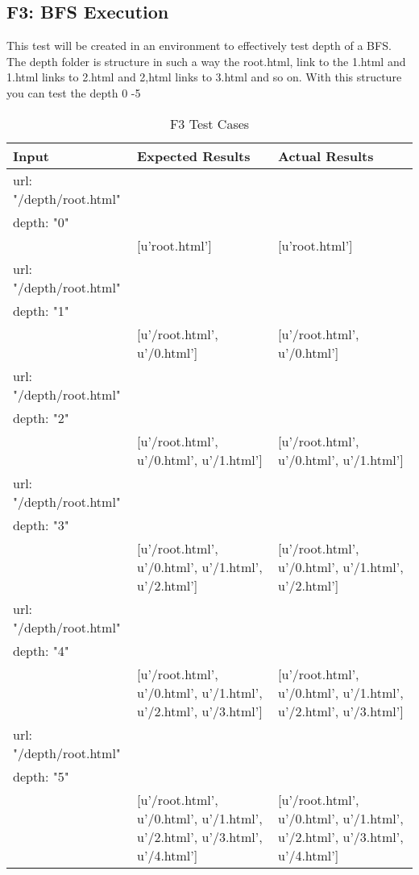 \documentclass[12pt, titlepage]{article}
\begin{document}
\subsection{F3: BFS Execution}
This test will be created in an environment to effectively test depth of a BFS. The depth folder is structure in such a way the root.html, link to the 1.html and 1.html links to 2.html and 2,html links to 3.html and so on. With this structure you can test the depth 0 -5
\begin{table}[h!]
\centering
\begin{tabular}{ p{7cm}  p{4cm}  p{4cm} }
	Input &Expected Results &Actual Results\\ \hline
	url: "/depth/root.html"\\
	depth: "0"\\
	&[u'root.html']& [u'root.html']\\ \hline
	url: "/depth/root.html"\\
	depth: "1"\\
	 & [u'/root.html', u'/0.html'] & [u'/root.html', u'/0.html'] \\ \hline
	url: "/depth/root.html"\\
	depth: "2"\\
	 & [u'/root.html', u'/0.html', u'/1.html'] & [u'/root.html', u'/0.html', u'/1.html']\\ \hline
	url: "/depth/root.html"\\
	depth: "3"\\
	 & [u'/root.html', u'/0.html', u'/1.html', u'/2.html'] & [u'/root.html', u'/0.html', u'/1.html', u'/2.html']\\ \hline
	url: "/depth/root.html"\\
	depth: "4"\\
	 & [u'/root.html', u'/0.html', u'/1.html', u'/2.html', u'/3.html'] & [u'/root.html', u'/0.html', u'/1.html', u'/2.html', u'/3.html']\\ \hline
	url: "/depth/root.html"\\
	depth: "5"\\
	& [u'/root.html', u'/0.html', u'/1.html', u'/2.html', u'/3.html', u'/4.html'] & [u'/root.html', u'/0.html', u'/1.html', u'/2.html', u'/3.html', u'/4.html']\\ \hline

\end{tabular}
\caption{F3 Test Cases}
\label{table:F3 Test Cases}
\end{table}
\end{document}
